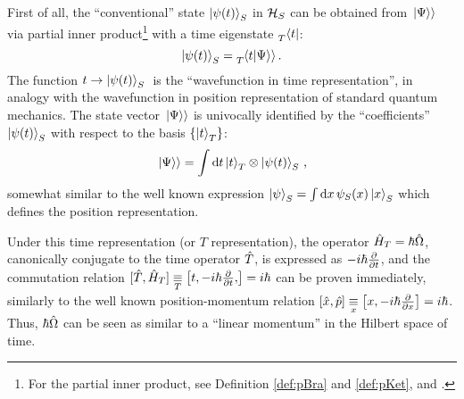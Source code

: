 First of all, the ``conventional'' state $\ket{\psi(t)}_S$ in $\mathcal{H}_S$
can be obtained from $\left.\left| \Psi \right\rangle\right\rangle$ via partial inner product\footnote{
  For the partial inner product,
  see Definition \ref{def:pBra} and \ref{def:pKet},
  and \cite[.3]{QMT_Jacobs}.
}
with a time eigenstate $\prescript{}{T}{\bra{t}}$:
\begin{equation}\label{eq:pw:standard_evolution}
  \ket{\psi(t)}_S = \prescript{}{T}{\!\left.\left\langle t \middle| \Psi \right\rangle\right\rangle} \, \text{.}
\end{equation}
The function $ t \rightarrow \ket{\psi(t)}_S \; $ is the
``wavefunction in time representation'', in analogy
with the wavefunction in position representation of standard quantum mechanics.
The state vector $\left.\left| \Psi \right\rangle\right\rangle$ is univocally identified by the ``coefficients'' $\ket{\psi(t)}_S$
with respect to the basis $\left\{\ket{t}_T\right\}$:
\begin{equation}\label{eq:pw:}
  \left.\left| \Psi \right\rangle\right\rangle = \int \dd{t} \ket{t}_T \otimes \ket{\psi(t)}_S \, \text{,}
\end{equation}
somewhat similar to the well known expression $\ket{\psi}_S = \int \dd{x} \psi_{S}(x) \ket{x}_S$
which defines the position representation.

Under this time representation%
(or $T$ representation), the operator $\hat{H}_T = \hbar\hat{\Omega}$,
canonically conjugate to the time operator $\hat{T}$, is expressed as $-i\hbar\pdv{t}$,
and the commutation relation
$[\op{T}, \op{H}_T] \repr[T] \comm{t, -i\hbar\pdv{t}}{} = i\hbar$
can be proven
immediately, similarly to the well known position-momentum relation
$\comm{\op{x}}{\op{p}} \repr[x] \comm{x}{-i\hbar\pdv{x}} = i\hbar$.
Thus, $\hbar\hat{\Omega}$ can be seen as similar to a ``linear momentum''
in the Hilbert space of time.


